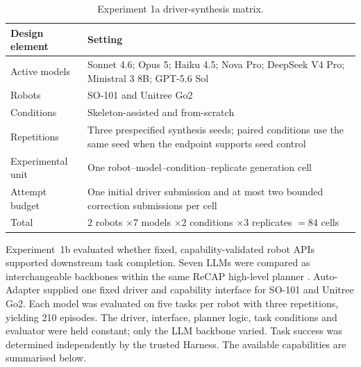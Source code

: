 \begin{table}[htbp]
  \centering
  \begingroup
  \small
  \renewcommand{\arraystretch}{1.12}
  \caption{Experiment 1a driver-synthesis matrix.}
  \label{tab:chapter3-exp1a-matrix}
  \begin{tabularx}{\textwidth}{@{}>{\raggedright\arraybackslash}p{39mm}X@{}}
    \toprule
    \textbf{Design element} & \textbf{Setting} \\
    \midrule
    Active models & Sonnet 4.6; Opus 5; Haiku 4.5; Nova Pro; DeepSeek V4 Pro; Ministral 3 8B; GPT-5.6 Sol \\
    Robots & SO-101 and Unitree Go2 \\
    Conditions & Skeleton-assisted and from-scratch \\
    Repetitions & Three prespecified synthesis seeds; paired conditions use the same seed when the endpoint supports seed control \\
    Experimental unit & One robot--model--condition--replicate generation cell \\
    Attempt budget & One initial driver submission and at most two bounded correction submissions per cell \\
    Total & $2$ robots $\times 7$ models $\times 2$ conditions $\times 3$ replicates $=84$ cells \\
    \bottomrule
  \end{tabularx}
  \endgroup
\end{table}

Experiment~1b evaluated whether fixed, capability-validated robot APIs
supported downstream task completion. Seven LLMs were compared as
interchangeable backbones within the same ReCAP high-level planner
\citep{zhang2025recap}. Auto-Adapter supplied one fixed driver and capability
interface for SO-101 and Unitree Go2. Each model was evaluated on five tasks
per robot with three repetitions, yielding 210 episodes. The driver,
interface, planner logic, task conditions and evaluator were held constant;
only the LLM backbone varied. Task success was determined independently by
the trusted Harness. The available capabilities are summarised below.

